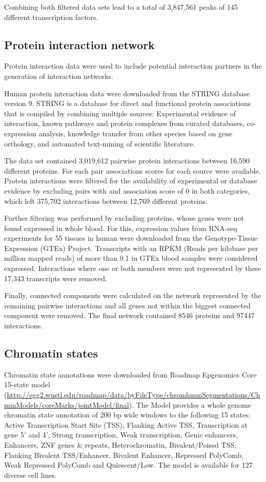 \documentclass[a4paper,12pt,twoside,openright]{article}
\begin{document}
Combining both filtered data sets lead to a total of 3,847,561 peaks of 145 different transcription factors.

\subsection{Protein interaction network}
\label{Data:Protein interaction network}
Protein interaction data were used to include potential interaction partners in the generation of interaction networks.

Human protein interaction data were downloaded from the STRING database version 9\cite{Franceschini2013}. STRING is a database for direct and functional protein associations that is compiled by combining multiple sources: Experimental evidence of interaction, known pathways and protein complexes from curated databases, co-expression analysis, knowledge transfer from other species based on gene orthology, and automated text-mining of scientific literature\cite{Szklarczyk2017}. 

The data set contained 3,019,612 pairwise protein interactions between 16,590 different proteins. For each pair associations scores for each source were available. Protein interactions were filtered for the availability of experimental or database evidence by excluding pairs with and association score of 0 in both categories, which left 375,702 interactions between 12,769 different proteins. 

Further filtering was performed by excluding proteins, whose genes were not found expressed in whole blood. For this, expression values from RNA-seq experiments for 55 tissues in human were downloaded from the  Genotype-Tissue Expression (GTEx) Project\cite{GTExConsortium2013}. Transcripts with an RPKM (Reads per kilobase per million mapped reads) of more than 0.1 in GTEx blood samples were considered expressed. Interactions where one or both members were not represented by these 17,343 transcripts were removed.

Finally, connected components were calculated on the network represented by the remaining pairwise interactions and all genes not within the biggest connected component were removed. The final network contained 8546 proteins and 97447 interactions. 

\subsection{Chromatin states}
\label{Data:Chromatin states}
Chromatin state annotations were downloaded from Roadmap Epgenomics Core 15-state model (\url{http://egg2.wustl.edu/roadmap/data/byFileType/chromhmmSegmentations/ChmmModels/coreMarks/jointModel/final}). The Model provides a whole genome chromatin state annotation of 200 bp wide windows to the following 15 states: Active Transcription Start Site (TSS), Flanking Active TSS, Transcription at gene 5' and 4', Strong transcription, Weak transcription, Genic enhancers, Enhancers, ZNF genes \& repeats, Heterochromatin, Bivalent/Poised TSS, Flanking Bivalent TSS/Enhancer, Bivalent Enhancer, Repressed PolyComb, Weak Repressed PolyComb and Quiescent/Low. The model is available for 127 diverse cell lines. 
\end{document}
